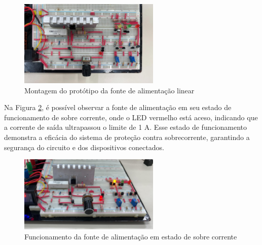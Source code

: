 \begin{figure}[H]
    \centering
    \includegraphics[width=0.6\textwidth]{../imagens/montagem_final.jpg}
    \caption{Montagem do protótipo da fonte de alimentação linear}
    \label{fig:montagem1}
\end{figure}

Na Figura \ref{fig:montagem2}, é possível observar a fonte de alimentação em seu estado de funcionamento de sobre corrente, onde o LED vermelho está aceso, indicando que a corrente de saída ultrapassou o limite de 1 A. Esse estado de funcionamento demonstra a eficácia do sistema de proteção contra sobrecorrente, garantindo a segurança do circuito e dos dispositivos conectados.

\begin{figure}[H]
    \centering
    \includegraphics[width=0.6\textwidth]{../imagens/montagem_testes.jpg}
    \caption{Funcionamento da fonte de alimentação em estado de sobre corrente}
    \label{fig:montagem2}
\end{figure}